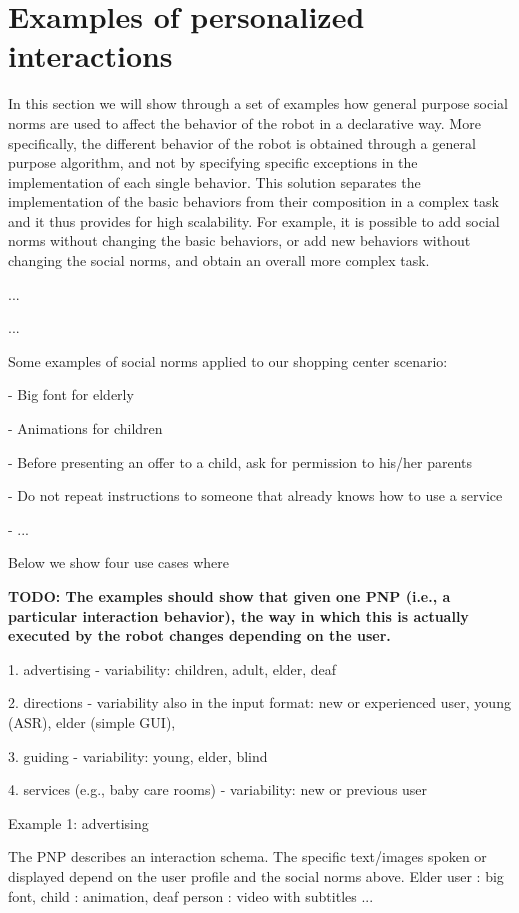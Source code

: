 \section{Examples of personalized interactions}


In this section we will show through a set of examples how general purpose social norms are used to affect the behavior of the robot in a declarative way. More specifically, the different behavior of the robot is obtained through a general purpose algorithm, and not by specifying specific exceptions in the implementation of each single behavior.
This solution separates the implementation of the basic behaviors from their composition in a complex task and it thus provides for high scalability. For example, it is possible to add social norms without changing the basic behaviors, or add new behaviors without changing the social norms, and obtain an overall more complex task.


...





...

Some examples of social norms applied to our shopping center scenario:

- Big font for elderly

- Animations for children 

- Before presenting an offer to a child, ask for permission to his/her parents

- Do not repeat instructions to someone that already knows how to use a service

- ...

Below we show four use cases where 


{\bf TODO: The examples should show that given one PNP (i.e., a particular interaction behavior), the way in which this is actually executed by the robot changes depending on the user.}




1. advertising - variability: children, adult, elder, deaf

2. directions - variability also in the input format: new or experienced user, young (ASR), elder (simple GUI), 

3. guiding - variability: young, elder, blind

4. services (e.g., baby care rooms) - variability: new or previous user


Example 1: advertising

The PNP describes an interaction schema. The specific text/images spoken or displayed depend on the user profile and the social norms above.
Elder user : big font, child : animation, deaf person : video with subtitles ...








